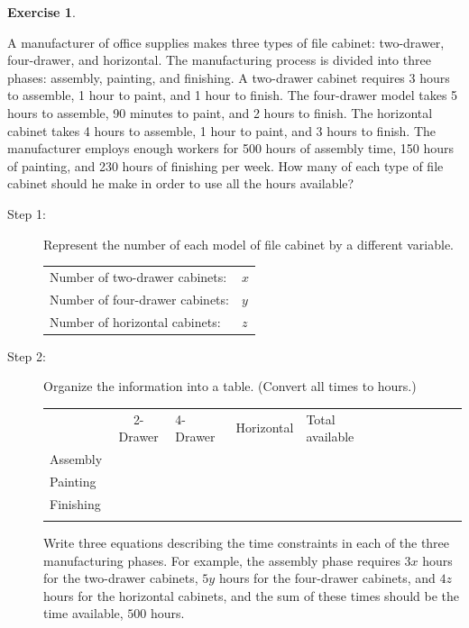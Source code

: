 \documentclass[10pt,]{book}
\theoremstyle{plain}
\theoremstyle{definition}
\theoremstyle{definition}
\theoremstyle{definition}
\theoremstyle{definition}
\newtheorem{exercise}[theorem]{Exercise}
\numberwithin{equation}{section}
\newcommand{\hrulethin}  {\noalign{\hrule height 0.04em}}
\newcommand{\hrulethick} {\noalign{\hrule height 0.11em}}
\begin{document}
\begin{exercise}\label{exercise-14}

		A manufacturer of office supplies makes three types of file cabinet: two-drawer, four-drawer, and horizontal. The manufacturing process is divided into three phases: assembly, painting, and finishing. A two-drawer cabinet requires 3 hours to assemble, 1 hour to paint, and 1 hour to finish. The four-drawer model takes 5 hours to assemble, 90 minutes to paint, and 2 hours to finish. The horizontal cabinet takes 4 hours to assemble, 1 hour to paint, and 3 hours to finish. The manufacturer employs enough workers for 500 hours of assembly time, 150 hours of painting, and 230 hours of finishing per week. How many of each type of file cabinet should he make in order to use all the hours available?
		\leavevmode%
\begin{description}
\item[Step 1:]{}
				Represent the number of each model of file cabinet by a different variable.
				\leavevmode%
\begin{table}
\centering
\begin{tabular}{ll}
Number of two-drawer cabinets:%
&\(x\)\tabularnewline[0pt]
Number of four-drawer cabinets:%
&\(y\)\tabularnewline[0pt]
Number of horizontal cabinets:%
&\(z\)
\end{tabular}
\end{table}

\item[Step 2:]{}
				Organize the information into a table. (Convert all times to hours.)
				\leavevmode%
\begin{table}
\centering
\begin{tabular}{AcAcAcAcAcA}\hrulethick
\(\)&2-Drawer%
&4-Drawer%
&Horizontal%
&Total available%
\tabularnewline\hrulethin
Assembly%
&\(\)&\(\)&\(\)&\(\)\tabularnewline\hrulethin
Painting%
&\(\)&\(\)&\(\)&\(\)\tabularnewline\hrulethin
Finishing%
&\(\)&\(\)&\(\)&\(\)\tabularnewline\hrulethin
\end{tabular}
\end{table}

				Write three equations describing the time constraints in each of the three manufacturing phases. For example, the assembly phase requires \(3x\) hours for the two-drawer cabinets, \(5y\) hours for the four-drawer cabinets, and \(4z\) hours for the horizontal cabinets, and the sum of these times should be the time available, \(500\) hours.
				\leavevmode%
\begin{table}
\centering
\begin{tabular}{lll}


\end{tabular}
\end{table}
\end{description}
\end{exercise}
\end{document}
